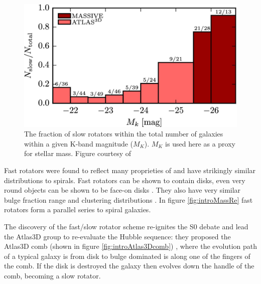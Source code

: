 {{	\begin{figure}
		\centering
		\includegraphics[width=\textwidth]{introduction/slowRotFraction.jpeg}
		\caption[Proportion of Slow Rotating Galaxies as a function of Mass]{The fraction of slow rotators within the total number of galaxies within a given K-band magnitude ($M_K$). $M_K$ is used here as a proxy for stellar mass. Figure courtesy of \citet{Veale2016}}
		\label{fig:introSlowRotFrac}
	\end{figure}

	Fast rotators were found to reflect many proprieties of and have strikingly similar distributions to spirals. Fast rotators can be shown to contain disks, even very round objects can be shown to be face-on disks \citep{Cappellari2013a, Weijmans2014}. They also have very similar bulge fraction range \citep{Krajnovic2013} and clustering distributions \citep{}. %
	In figure \ref{fig:introMassRe} fast rotators form a parallel series to spiral galaxies.

	The discovery of the fast/slow rotator scheme re-ignites the S0 debate and lead the Atlas3D group to re-evaluate the Hubble sequence: they proposed the Atlas3D comb (shown in figure \ref{fig:introAtlas3Dcomb}) \citep{Cappellari2011a}, where the evolution path of a typical galaxy is from disk to bulge dominated is along one of the fingers of the comb. If the disk is destroyed the galaxy then evolves down the handle of the comb, becoming a slow rotator. 

}}
